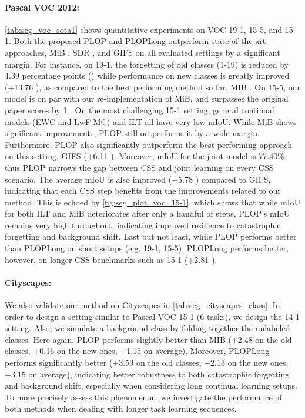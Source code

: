 \paragraph{Pascal VOC 2012:} \autoref{tab:seg_voc_sota1} shows quantitative experiments on
VOC 19-1, 15-5, and 15-1. Both the proposed PLOP and PLOPLong outperform state-of-the-art
approaches, MiB \citep{cermelli2020modelingthebackground}, SDR \citep{michieli2021sdr}, and GIFS
\citep{cermelli2020fewshotcontinualsegm} on all evaluated settings by a significant margin. For
instance, on 19-1, the forgetting of old classes (1-19) is reduced by 4.39 percentage points (\pp)
while performance on new classes is greatly improved (+13.76 \pp), as compared to the best
performing method so far, MIB \citep{cermelli2020modelingthebackground}. On 15-5, our model is on par
with our re-implementation of MiB, and surpasses the original paper scores
\citep{cermelli2020modelingthebackground} by 1 \pp. On the most challenging 15-1 setting, general
continual models (EWC and LwF-MC) and ILT all have very low \ac{mIoU}. While MiB shows significant
improvements, PLOP still outperforms it by a wide margin. Furthermore, PLOP also significantly
outperform the best performing approach on this setting, GIFS
\cite{cermelli2020fewshotcontinualsegm} (+6.11 \pp). Moreover, \ac{mIoU} for the joint model is
$77.40\%$, thus PLOP narrows the gap between \ac{CSS} and joint learning on every \ac{CSS} scenario. The
average \ac{mIoU} is also improved (+5.78 \pp) compared to GIFS, indicating that each \ac{CSS} step
benefits from the improvements related to our method. This is echoed by
\autoref{fig:seg_plot_voc_15-1}, which shows that while \ac{mIoU} for both ILT and MiB deteriorates
after only a handful of steps, PLOP's \ac{mIoU} remains very high throughout, indicating improved
resilience to catastrophic forgetting and background shift. Last but not least, while PLOP performs
better than PLOPLong on short setups (e.g. 19-1, 15-5), PLOPLong performs better, however, on longer
\ac{CSS} benchmarks such as 15-1 (+2.81 \pp).



\paragraph{Cityscapes:} We also validate our method on Cityscapes in
\autoref{tab:seg_cityscapes_class}. In order to design a setting similar to Pascal-VOC 15-1 (6
tasks), we design the 14-1 setting. Also, we simulate a background class by folding together the
unlabeled classes. Here again, PLOP performs slightly better than MIB (+2.48 \pp on the old classes,
+0.16 \pp on the new ones, +1.15 \pp on average). Moreover, PLOPLong performs significantly better
(+3.59 \pp on the old classes, +2.13 \pp on the new ones, +3.15 \pp on average), indicating better
robustness to both catastrophic forgetting and background shift, especially when considering long
continual learning setups. To more precisely assess this phenomenon, we investigate the performance
of both methods when dealing with longer task learning sequences.

